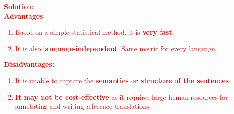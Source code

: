 \begin{parts}
\begin{subparts}
\textcolor{red}{\textbf{Solution: }\\
\textbf{Advantages:}
\begin{enumerate}
\item Based on a simple statistical method, it is \textbf{very fast}.
\item It is also \textbf{language-independent}. Same metric for every language.
\end{enumerate}
\textbf{Disadvantages:}
\begin{enumerate}
\item It is unable to capture the \textbf{semantics or structure of the sentences}.
\item \textbf{It may not be cost-effective} as it requires large human resources for annotating and writing reference translations.\end{enumerate}
}        
    \end{subparts}
\end{parts}

